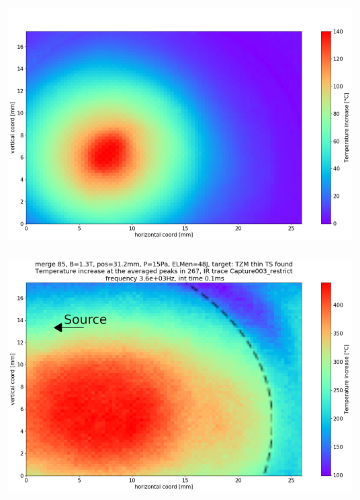 \begin{figure}
     \centering
     \begin{subfigure}{0.6\linewidth}
         \centering
         \includegraphics[width=\textwidth,trim={50 40 10 60},clip]{Chapters/chapter3/figs/file_index_393_IR_trace_Capture048_32b.png}
        \vspace*{-5mm}
        {\color{white}\caption{\phantom{wewew}}\label{fig:IR8a}}
     \end{subfigure}
     \hfill
     \begin{subfigure}{0.6\linewidth}
         \centering
         \includegraphics[width=\textwidth,trim={50 40 10 66},clip]{Chapters/chapter3/figs/file_index_267_IR_trace_Capture003_restrict_32b (copy).png}

\end{subfigure}
\end{figure}
